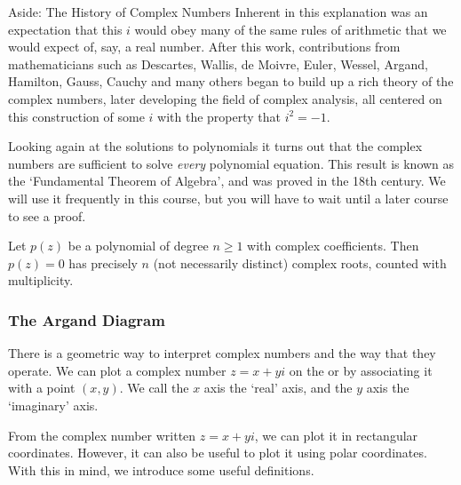 \documentclass[a4paper]{scrartcl}
\begin{document}
\begin{aside}{Aside: The History of Complex Numbers}
Inherent in this explanation was an expectation that this $i$ would obey many of the same rules of arithmetic that we would expect of, say, a real number. After this work, contributions from mathematicians such as Descartes, Wallis, de Moivre, Euler, Wessel, Argand, Hamilton, Gauss, Cauchy and many others began to build up a rich theory of the complex numbers, later developing the field of complex analysis, all centered on this construction of some $i$ with the property that $i^2 = -1$. 

\end{aside}

Looking again at the solutions to polynomials it turns out that the complex numbers are sufficient to solve \emph{every} polynomial equation. This result is known as the `Fundamental Theorem of Algebra', and was proved in the 18th century. We will use it frequently in this course, but you will have to wait until a later course to see a proof.
\begin{theorem}
Let $p(z)$ be a polynomial of degree $n \geq 1$ with complex coefficients. Then $p(z) = 0$ has precisely $n$ (not necessarily distinct) complex roots, counted with multiplicity. 
\end{theorem}

\subsubsection{The Argand Diagram}

There is a geometric way to interpret complex numbers and the way that they operate. We can plot a complex number $z = x + yi$ on the  or  by associating it with a point $(x, y)$. We call the $x$ axis the `real' axis, and the $y$ axis the `imaginary' axis.

\begin{center}
\end{center}

From the complex number written $z= x + yi$, we can plot it in rectangular coordinates. However, it can also be useful to plot it using polar coordinates. With this in mind, we introduce some useful 
definitions.
\end{document}
